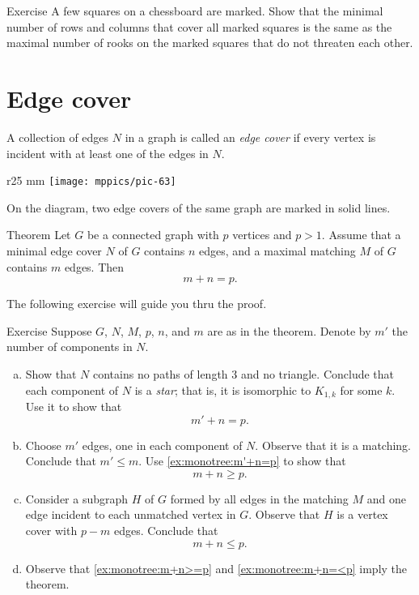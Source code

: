 \begin{thm}{Exercise}\label{ex:rooks}
A few squares on a chessboard are marked.
Show that the minimal number of rows and columns that cover all marked squares is the same as the maximal number of rooks on the marked squares that do not threaten each other.
\end{thm}

\section{Edge cover}

A collection of edges $N$ in a graph is called an \emph{edge cover} if every vertex is incident with at least one of the edges in $N$.

\begin{wrapfigure}{r}{25 mm}
\vskip-2mm
\centering
\texttt{[image: mppics/pic-63]}
\vskip0mm
\end{wrapfigure}

On the diagram, two edge covers of the same graph are marked in solid lines.

\begin{thm}{Theorem}
Let $G$ be a connected graph with $p$ vertices and $p>1$.
Assume that a minimal edge cover $N$ of $G$ contains $n$ edges, and a maximal matching $M$ of $G$ contains $m$ edges.
Then
\[m+n=p.\]
\end{thm}

The following exercise will guide you thru the proof.


\begin{thm}{Exercise}\label{ex:monotree}
Suppose $G$, $N$, $M$, $p$, $n$, and $m$ are as in the theorem.
Denote by $m'$ the number of components in $N$.
\begin{enumerate}[(a)]
\item\label{ex:monotree:m'+n=p} Show that $N$ contains no paths of length 3 and no triangle.
Conclude that each component of $N$ is a \emph{star};
that is, it is isomorphic to $K_{1,k}$ for some $k$.
Use it to show that 
\[m'+n=p.\]
\item\label{ex:monotree:m+n>=p} Choose $m'$ edges, one in each component of $N$.
Observe that it is a matching.
Conclude that $m'\le m$.
Use \ref{ex:monotree:m'+n=p} to show that 
\[m+n\ge p.\]
\item\label{ex:monotree:m+n=<p} Consider a subgraph $H$ of $G$ formed by all edges in the matching $M$ and one edge incident to each unmatched vertex in $G$.
Observe that $H$ is a vertex cover with $p-m$ edges. 
Conclude that 
\[m+n\le p.\]
\item Observe that \ref{ex:monotree:m+n>=p} and \ref{ex:monotree:m+n=<p} imply the theorem.
\end{enumerate}

\end{thm}


